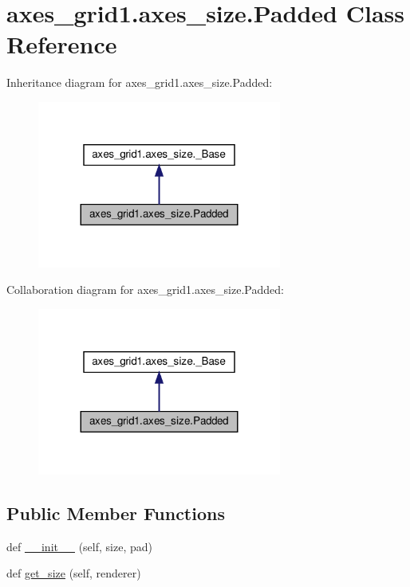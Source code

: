 \hypertarget{classaxes__grid1_1_1axes__size_1_1Padded}{}\section{axes\+\_\+grid1.\+axes\+\_\+size.\+Padded Class Reference}
\label{classaxes__grid1_1_1axes__size_1_1Padded}


Inheritance diagram for axes\+\_\+grid1.\+axes\+\_\+size.\+Padded\+:
\nopagebreak
\begin{figure}[H]
\begin{center}
\leavevmode
\includegraphics[width=227pt]{classaxes__grid1_1_1axes__size_1_1Padded__inherit__graph}
\end{center}
\end{figure}


Collaboration diagram for axes\+\_\+grid1.\+axes\+\_\+size.\+Padded\+:
\nopagebreak
\begin{figure}[H]
\begin{center}
\leavevmode
\includegraphics[width=227pt]{classaxes__grid1_1_1axes__size_1_1Padded__coll__graph}
\end{center}
\end{figure}
\subsection*{Public Member Functions}
\begin{DoxyCompactItemize}
\item 
def \hyperlink{classaxes__grid1_1_1axes__size_1_1Padded_a307774345c0068d244ca7cd7ad4612b7}{\+\_\+\+\_\+init\+\_\+\+\_\+} (self, size, pad)
\item 
def \hyperlink{classaxes__grid1_1_1axes__size_1_1Padded_af39130be03329db73d2c9f93e45f035b}{get\+\_\+size} (self, renderer)
\end{DoxyCompactItemize}



